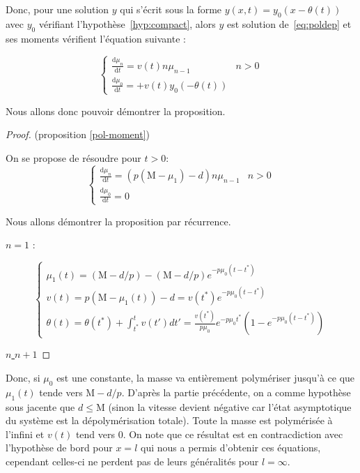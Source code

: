 \documentclass[a4paper]{article}
\theoremstyle{definition}
\theoremstyle{remark}
\newcommand{\mass}{\mathrm{M}}
\newcommand{\pol}{p}
\newcommand{\dep}{d}
\begin{document}
Donc, pour une solution $y$ qui s'écrit sous la forme $y(x,t) = y_0(x- \theta(t))$ 
avec $y_0$ vérifiant l'hypothèse~\eqref{hyp:compact}, 
alors $y$ est solution de~\eqref{eq:poldep} 
et ses moments vérifient l'équation suivante :

\begin{equation}
	\label{mmt}
\begin{cases}
\displaystyle \frac{\mathrm{d} \mu_n }{\mathrm{d}t} = v(t) n \mu_{n-1} & n>0 \\
\displaystyle \frac{\mathrm{d} \mu_0 }{\mathrm{d}t} = + v(t) y_0(-\theta(t))
\end{cases}
\end{equation}


Nous allons donc pouvoir démontrer la proposition.

\begin{proof}
	(proposition \ref{pol-moment})
	
	On se propose de résoudre pour $t>0$:
	\begin{equation}
		\label{mmtpol}
	\begin{cases}
	\displaystyle \frac{\mathrm{d} \mu_n }{\mathrm{d}t} = (\pol(\mass - \mu_1)-\dep)n \mu_{n-1} & n>0 \\
	\displaystyle \frac{\mathrm{d} \mu_0 }{\mathrm{d}t} = 0
	\end{cases}
	\end{equation}
	
	Nous allons démontrer la proposition par récurrence. 

	\underline{$n=1$} :

	\begin{equation}
		\begin{cases}
			\mu_1 (t) = (\mass - \dep/\pol) - (\mass - \dep/\pol)e^{-\pol \mu_0 (t-t^*)} \\
			v(t) = \pol( \mass - \mu_1 (t)) - \dep = v(t^*)e^{-\pol \mu_0 (t-t^*)}\\
			\theta (t) = \theta(t^*) + \int_{t^*}^t v(t')dt' = \frac{v(t^*)}{\pol \mu_0} e^{-\pol \mu_0 t^*}(1-e^{-\pol \mu_0 (t-t^*)})
		\end{cases}
	\end{equation}
	
	\vspace{0.5}
	
	\underline{$n$ 	\Rightarrow $n+1$}
\end{proof}


Donc, si $\mu_0$ est une constante, la masse va entièrement polymériser jusqu'à ce que $\mu_1(t)$ tende vers $\mass-\dep/\pol$. D'après la partie précédente, on a comme hypothèse sous jacente que $\dep \leq \mass$ (sinon la vitesse devient négative car l'état asymptotique du système est la dépolymérisation totale). Toute la masse est polymérisée à l'infini et $v(t)$ tend vers $0$. On note que ce résultat est en contracdiction avec l'hypothèse de bord pour $x=l$ qui nous a permis d'obtenir ces équations, cependant celles-ci ne perdent pas de leurs généralités pour $l= \infty$. 
\end{document}
